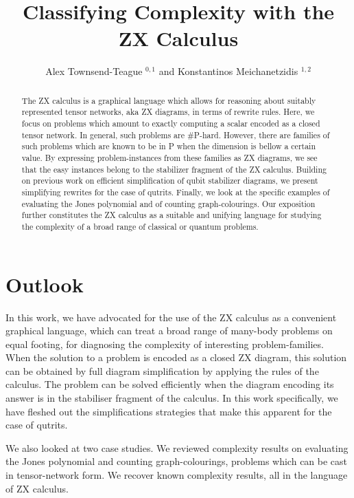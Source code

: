\documentclass[submission,copyright,creativecommons]{eptcs}
\title{Classifying Complexity with the ZX Calculus}
\author{  Alex Townsend-Teague $^{0,1}$ and Konstantinos Meichanetzidis $^{1,2}$
\institute{$^0$ Mathematical Institute, University of Oxford}
\institute{$^1$ Department of Computer Science, University of Oxford}
\institute{$^2$ Cambridge Quantum Computing Ltd.} }
\begin{document}
\maketitle
\begin{abstract}
The ZX calculus is a graphical language which allows for reasoning about suitably represented tensor networks, aka ZX diagrams,
in terms of rewrite rules.
Here, we focus on problems which amount to exactly computing
a scalar encoded as a closed tensor network.
In general, such problems are \#P-hard.
However, there are families of such problems which are known to be in P
when the dimension is bellow a certain value.
By expressing problem-instances from these families as ZX diagrams,
we see that the easy instances belong to the stabilizer fragment of the ZX calculus.
Building on previous work on efficient simplification of qubit stabilizer diagrams, we present simplifying rewrites for the case of qutrits.
Finally, we look at the specific examples of evaluating the Jones polynomial
and of counting graph-colourings.
Our exposition further constitutes the ZX calculus as a suitable and unifying language for studying the complexity of
a broad range of classical or quantum problems.
\end{abstract}






\section{Outlook}


In this work, we have advocated for the use of the ZX calculus
as a convenient graphical language, which can treat a broad range of many-body problems on equal footing,
for diagnosing the complexity of interesting problem-families.
When the solution to a problem is encoded as a closed ZX diagram,
this solution can be obtained by full diagram simplification by applying the rules of the calculus.
The problem can be solved efficiently when the diagram encoding its answer is in the stabiliser fragment of the calculus.
In this work specifically, we have fleshed out the simplifications strategies that make this apparent for the case of qutrits.

We also looked at two case studies.
We reviewed complexity results on evaluating the Jones polynomial and counting graph-colourings, problems which can be cast in tensor-network form.
We recover known complexity results, all in the language of ZX calculus.
\end{document}
